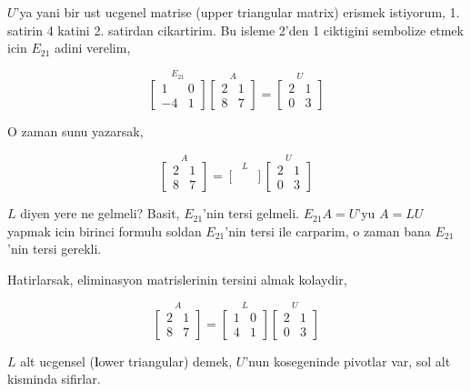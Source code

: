\documentclass[12pt,fleqn]{article}\usepackage{../common}
\begin{document}
$U$'ya yani bir ust ucgenel matrise (upper triangular matrix) erismek
istiyorum, 1. satirin 4 katini 2. satirdan cikartirim. Bu isleme 2'den 
1 ciktigini sembolize etmek icin $E_{21}$ adini verelim, 

\[ 
\stackrel{E_{21}}{
\left[\begin{array}{rr}
1 & 0 \\ -4 & 1
\end{array}\right]
}
\stackrel{A}{
\left[\begin{array}{rr}
2 & 1 \\ 8 & 7
\end{array}\right]
}
=
\stackrel{U}{
\left[\begin{array}{rr}
2 & 1 \\ 0 & 3
\end{array}\right]
}
 \]

O zaman sunu yazarsak, 

\[ 
\stackrel{A}{
\left[\begin{array}{rr}
2 & 1 \\ 8 & 7
\end{array}\right]
}
=
\stackrel{L}{
\left[\begin{array}{rr}
 &  \\  & 
\end{array}\right]
}
\stackrel{U}{
\left[\begin{array}{rr}
2 & 1 \\ 0 & 3
\end{array}\right]
}
 \]

$L$ diyen yere ne gelmeli? Basit, $E_{21}$'nin tersi gelmeli. $E_{21}A =
U$'yu 
$A=LU $ yapmak icin birinci formulu soldan $E_{21}$'nin tersi ile
carparim, o zaman bana $E_{21}$'nin tersi gerekli. 

Hatirlarsak, eliminasyon matrislerinin tersini almak kolaydir,

\[ 
\stackrel{A}{
\left[\begin{array}{rr}
2 & 1 \\ 8 & 7
\end{array}\right]
}
=
\stackrel{L}{
\left[\begin{array}{rr}
1 & 0 \\ 4 & 1
\end{array}\right]
}
\stackrel{U}{
\left[\begin{array}{rr}
2 & 1 \\ 0 & 3
\end{array}\right]
}
 \]

$L$ alt ucgensel (\textbf{l}ower triangular) demek, $U$'nun kosegeninde
pivotlar var, sol alt kisminda sifirlar. 
\end{document}
